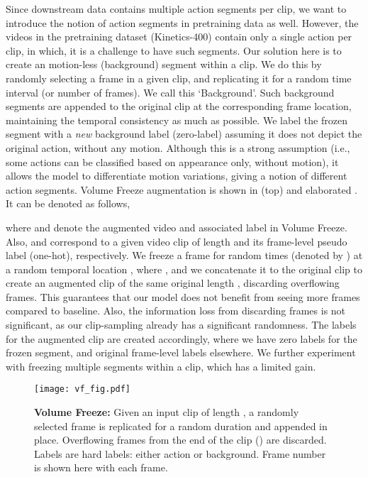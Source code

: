 \documentclass[letterpaper]{article} \usepackage{aaai23}  \usepackage{times}  \usepackage{helvet}  \usepackage{courier}  \usepackage[hyphens]{url}  \usepackage{graphicx} \urlstyle{rm} \def\UrlFont{\rm}  \usepackage{natbib}  \usepackage{caption} \frenchspacing  \setlength{\pdfpagewidth}{8.5in}  \setlength{\pdfpageheight}{11in}  \usepackage{algorithm}
\newcommand{\ch}{}
\begin{document}
Since downstream data contains multiple action segments per clip, we want to introduce the notion of action segments in pretraining data as well. However, the videos in the pretraining dataset (Kinetics-400) contain only a single action per clip, in which, it is a challenge to have such segments. 
Our solution here is to create an motion-less (background) segment within a clip. We do this by randomly selecting a frame in a given clip, and replicating it for a random time interval (or number of frames). We call this `Background'. Such background segments are appended to the original clip at the corresponding frame location, maintaining the temporal consistency as much as possible. We label the frozen segment with a \textit{new} background label (zero-label) assuming it does not depict the original action, without any motion. Although this is a strong assumption (i.e., some actions can be classified based on appearance only, without motion), it allows the model to differentiate motion variations, giving a notion of different action segments. Volume Freeze augmentation is shown in  (top) and elaborated . It can be denoted as follows,
{\small

}where  and  denote the augmented video and associated label in Volume Freeze. Also,  and  correspond to a given video clip of length  and its frame-level pseudo label (one-hot), respectively. We freeze a frame for random  times (denoted by ) at a random temporal location , where , and we concatenate it to the original clip to create an augmented clip of the same original length , discarding overflowing frames. \ch{This guarantees that our model does not benefit from seeing more frames compared to baseline. Also, the information loss from discarding frames is not significant, as our clip-sampling already has a significant randomness.} The labels for the augmented clip are created accordingly, where we have zero labels for the frozen segment, and original frame-level labels elsewhere. We further experiment with freezing multiple segments within a clip, which has a limited gain.

\begin{figure}[t]
	\centering
	\texttt{[image: vf\_fig.pdf]}
	\caption{\textbf{Volume Freeze:} Given an input clip of length , a randomly selected frame  is replicated for a random  duration and appended in place. Overflowing frames from the end of the clip () are discarded. Labels are hard labels: either action or background. Frame number is shown here with each frame.}
	\label{fig:vf}
\end{figure}
\end{document}
